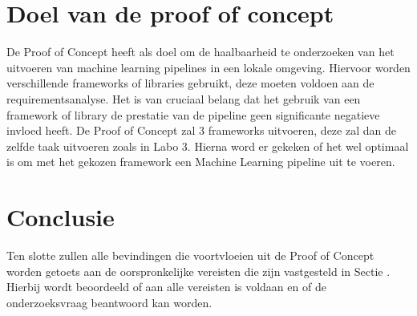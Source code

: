 \section{Doel van de proof of concept}
De Proof of Concept heeft als doel om de haalbaarheid te onderzoeken van het uitvoeren van machine learning pipelines in een lokale omgeving. Hiervoor worden verschillende frameworks of libraries  gebruikt, deze moeten voldoen aan de requirementsanalyse.
Het is van cruciaal belang dat het gebruik van een framework of library de prestatie van de pipeline geen significante negatieve invloed heeft. De Proof of Concept zal 3 frameworks uitvoeren, deze zal dan de zelfde taak uitvoeren zoals in Labo 3. Hierna word er gekeken of het wel optimaal is om met het gekozen framework een Machine Learning pipeline uit te voeren.

\section{Conclusie}
Ten slotte zullen alle bevindingen die voortvloeien uit de Proof of Concept worden getoets aan de oorspronkelijke vereisten die zijn vastgesteld in Sectie . Hierbij
wordt beoordeeld of aan alle vereisten is voldaan en of de onderzoeksvraag beantwoord kan worden.

